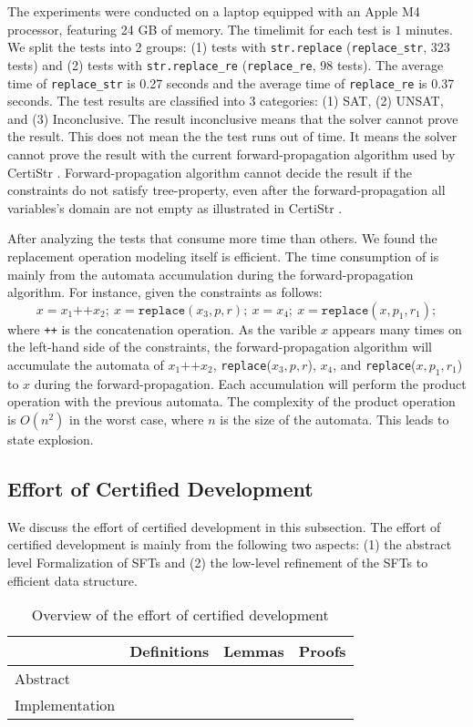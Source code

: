 \documentclass[a4paper,UKenglish,cleveref, autoref, anonymous, thm-restate]{lipics-v2021}
\begin{document}
The experiments were conducted on a laptop equipped with an Apple M4 processor, featuring 24 GB of memory. The timelimit for each test is $1$ minutes. We split the tests into 2 groups: (1) tests with \texttt{str.replace} (\texttt{replace\_str}, 323 tests) and (2) tests with \texttt{str.replace\_re} (\texttt{replace\_re}, 98 tests). The average time of \texttt{replace\_str} is 0.27 seconds and the average time of \texttt{replace\_re} is 0.37 seconds. The test results are classified into 3 categories: (1) SAT, (2) UNSAT, and (3) Inconclusive.
The result inconclusive means that the solver cannot prove the result. This does not mean the the test runs out of time. It means the solver cannot prove the result with the current forward-propagation algorithm used by CertiStr \cite{cpp/KanLRS22}. Forward-propagation algorithm cannot decide the result if the constraints do not satisfy tree-property, even after the forward-propagation all variables's domain are not empty as illustrated in CertiStr \cite{cpp/KanLRS22}.

After analyzing the tests that consume more time than others. We found the replacement operation modeling itself is efficient. The time consumption of is mainly from the automata accumulation during the forward-propagation algorithm. For instance, given the constraints as follows: 
\[
x=x_1\texttt{++}x_2;~x = \texttt{replace}(x_3, p, r);~x = x_4;~x = \texttt{replace}(x, p_1, r_1);
\]
where \texttt{++} is the concatenation operation. As the varible $x$ appears many times on the left-hand side of the constraints, the forward-propagation algorithm will accumulate the automata of $x_1\texttt{++}x_2$, \texttt{replace}($x_3, p, r$), $x_4$, and \texttt{replace}($x, p_1, r_1$) to $x$ during the forward-propagation. Each accumulation will perform the product operation with the previous automata. The complexity of the product operation is $O(n^2)$ in the worst case, where $n$ is the size of the automata. This leads to state explosion.

\subsection{Effort of Certified Development}

We discuss the effort of certified development in this subsection.
The effort of certified development is mainly from the following two aspects: (1) the abstract level Formalization of SFTs and (2) the low-level refinement of the SFTs to efficient data structure.


\begin{table}[h]
  \centering
  \begin{tabular}{lccc}
      \toprule
      & \textbf{Definitions} & \textbf{Lemmas} & \textbf{Proofs} \\
      \midrule
      Abstract & & & \\
      Implementation & & & \\
      \bottomrule
  \end{tabular}
  \caption{Overview of the effort of certified development}
  \label{tab:abstract_impl}
\end{table}
\end{document}
